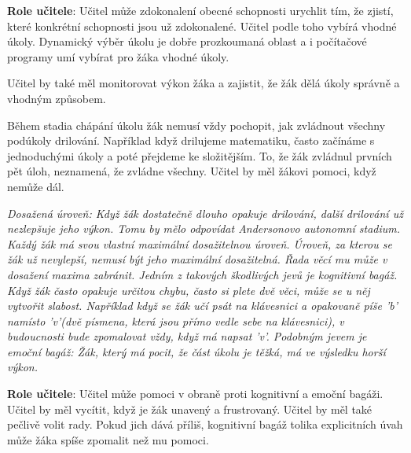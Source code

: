 {\bf Role učitele}: Učitel může zdokonalení obecné schopnosti urychlit tím, že zjistí, které konkrétní schopnosti jsou už zdokonalené.  Učitel podle toho vybírá vhodné úkoly.  Dynamický výběr úkolu je dobře prozkoumaná oblast\citep{hintzman1976repetition} a i počítačové programy umí vybírat pro žáka vhodné úkoly\citep{anki}.

Učitel by také měl monitorovat výkon žáka a zajistit, že žák dělá úkoly správně a vhodným způsobem.

Během stadia chápání úkolu žák nemusí vždy pochopit, jak zvládnout všechny podúkoly drilování.  Například když drilujeme matematiku, často začínáme s jednoduchými úkoly a poté přejdeme ke složitějším.  To, že žák zvládnul prvních pět úloh, neznamená, že zvládne všechny.  Učitel by měl žákovi pomoci, když nemůže dál.

\em Dosažená úroveň\em : Když žák dostatečně dlouho opakuje drilování, další drilování už nezlepšuje jeho výkon.  Tomu by mělo odpovídat Andersonovo autonomní stadium.  Každý žák má svou vlastní maximální dosažitelnou úroveň.  Úroveň, za kterou se žák už nevylepší, nemusí být jeho maximální dosažitelná.  Řada věcí mu může v dosažení maxima zabránit.  Jedním z takových škodlivých jevů je kognitivní bagáž. Když žák často opakuje určitou chybu, často si plete dvě věci, může se u něj vytvořit slabost. Například když se žák učí psát na klávesnici a opakovaně píše 'b' namísto 'v'(dvě písmena, která jsou přímo vedle sebe na klávesnici), v budoucnosti bude zpomalovat vždy, když má napsat 'v'. Podobným jevem je emoční bagáž: Žák, který má pocit, že část úkolu je těžká, má ve výsledku horší výkon.

{\bf Role učitele}: Učitel může pomoci v obraně proti kognitivní a emoční bagáži.  Učitel by měl vycítit, když je žák unavený a frustrovaný. Učitel by měl také pečlivě volit rady.  Pokud jich dává příliš, kognitivní bagáž tolika explicitních úvah může žáka spíše zpomalit než mu pomoci.
